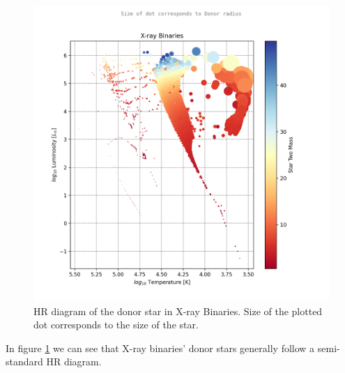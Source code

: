 \documentclass[12pt, a4paper]{article}
\begin{document}
        \begin{figure}[H]
            \centering
            \includegraphics[scale = .6]{figs/GeneratedFigs/ X-ray Binaries Star Two Mass log10 F star radius T.png}
            \caption{HR diagram of the donor star in X-ray Binaries. Size of the plotted dot corresponds to the size of the star.}
            \label{XrayBinaryHRDiagram}
        \end{figure}

        In figure \ref{XrayBinaryHRDiagram} we can see that X-ray binaries' donor stars generally follow a semi-standard HR diagram. 
        
\end{document}
